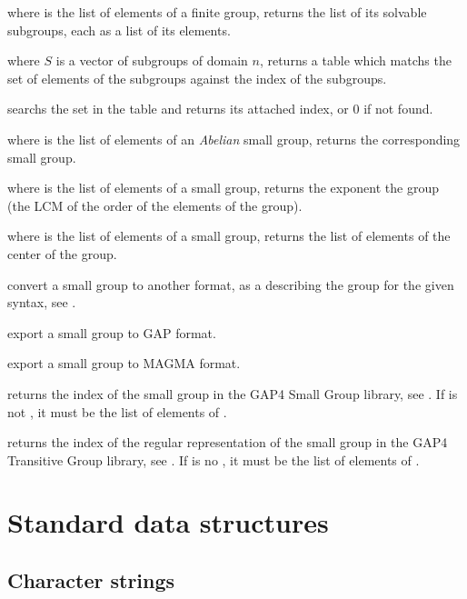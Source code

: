  where  is the list of
elements of a finite group, returns the list of its solvable subgroups,
each as a list of its elements.

 where $S$ is a vector of subgroups
of domain $n$, returns a table which matchs the set of elements of the
subgroups against the index of the subgroups.

 searchs the set  in
the table  and returns its attached index, or $0$ if not found.

 where  is the list of
elements of an \emph{Abelian} small group, returns the corresponding
small group.

 where  is the list of
elements of a small group, returns the exponent the group (the LCM of the order
of the elements of the group).

 where  is the list of elements
of a small group, returns the list of elements of the center of the
group.

 convert a small group
to another format, as a  describing the group for the given syntax,
see .

 export a small group to GAP format.

 export a small group to MAGMA format.

 returns the index of the small group
 in the GAP4 Small Group library, see . If
 is not , it must be the list of elements of .

 returns the index of the
regular representation of the small group  in the GAP4 Transitive
Group library, see . If  is no , it must be
the list of elements of .

\newpage
\chapter{Standard data structures}

\section{Character strings}

